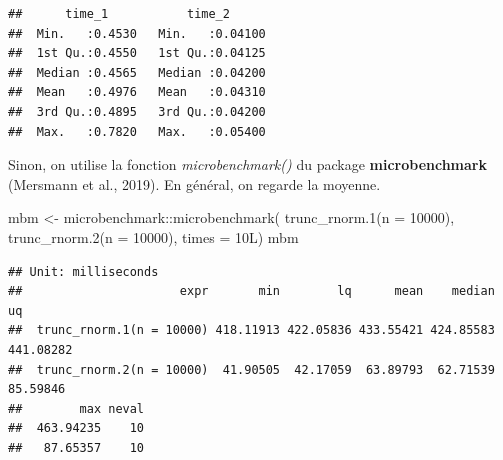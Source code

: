 \documentclass[
]{book}
\newenvironment{Shaded}{\begin{snugshade}}{\end{snugshade}}
\newcommand{\AttributeTok}[1]{\textcolor[rgb]{0.77,0.63,0.00}{#1}}
\newcommand{\ControlFlowTok}[1]{\textcolor[rgb]{0.13,0.29,0.53}{\textbf{#1}}}
\newcommand{\DecValTok}[1]{\textcolor[rgb]{0.00,0.00,0.81}{#1}}
\newcommand{\FunctionTok}[1]{\textcolor[rgb]{0.00,0.00,0.00}{#1}}
\newcommand{\NormalTok}[1]{#1}
\newcommand{\OtherTok}[1]{\textcolor[rgb]{0.56,0.35,0.01}{#1}}
\newcommand{\SpecialCharTok}[1]{\textcolor[rgb]{0.00,0.00,0.00}{#1}}
\theoremstyle{definition}
\theoremstyle{definition}
\theoremstyle{definition}
\theoremstyle{definition}
\theoremstyle{remark}
\begin{document}
\begin{Shaded}
\end{Shaded}

\begin{verbatim}
##      time_1           time_2       
##  Min.   :0.4530   Min.   :0.04100  
##  1st Qu.:0.4550   1st Qu.:0.04125  
##  Median :0.4565   Median :0.04200  
##  Mean   :0.4976   Mean   :0.04310  
##  3rd Qu.:0.4895   3rd Qu.:0.04200  
##  Max.   :0.7820   Max.   :0.05400
\end{verbatim}

Sinon, on utilise la fonction \emph{microbenchmark()} du package \textbf{microbenchmark} (Mersmann et al., 2019). En général, on regarde la moyenne.

\begin{Shaded}
\begin{Highlighting}[]
\NormalTok{mbm }\OtherTok{\textless{}{-}}\NormalTok{ microbenchmark}\SpecialCharTok{::}\FunctionTok{microbenchmark}\NormalTok{(}
  \FunctionTok{trunc\_rnorm.1}\NormalTok{(}\AttributeTok{n =} \DecValTok{10000}\NormalTok{),}
  \FunctionTok{trunc\_rnorm.2}\NormalTok{(}\AttributeTok{n =} \DecValTok{10000}\NormalTok{),}
  \AttributeTok{times =}\NormalTok{ 10L)}
\NormalTok{mbm}
\end{Highlighting}
\end{Shaded}

\begin{verbatim}
## Unit: milliseconds
##                      expr       min        lq      mean    median        uq
##  trunc_rnorm.1(n = 10000) 418.11913 422.05836 433.55421 424.85583 441.08282
##  trunc_rnorm.2(n = 10000)  41.90505  42.17059  63.89793  62.71539  85.59846
##        max neval
##  463.94235    10
##   87.65357    10
\end{verbatim}
\end{document}
